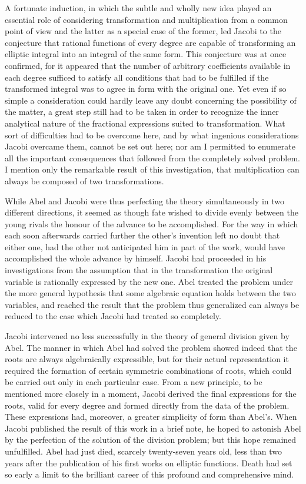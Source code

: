 \documentclass[11pt]{article}
\begin{document}
A fortunate induction, in which the subtle and wholly new idea played an essential role of considering transformation and multiplication from a common point of view and the latter as a special case of the former, led Jacobi to the conjecture that rational functions of every degree are capable of transforming an elliptic integral into an integral of the same form. This conjecture was at once confirmed, for it appeared that the number of arbitrary coefficients available in each degree sufficed to satisfy all conditions that had to be fulfilled if the transformed integral was to agree in form with the original one. Yet even if so simple a consideration could hardly leave any doubt concerning the possibility of the matter, a great step still had to be taken in order to recognize the inner analytical nature of the fractional expressions suited to transformation. What sort of difficulties had to be overcome here, and by what ingenious considerations Jacobi overcame them, cannot be set out here; nor am I permitted to enumerate all the important consequences that followed from the completely solved problem. I mention only the remarkable result of this investigation, that multiplication can always be composed of two transformations.

While Abel and Jacobi were thus perfecting the theory simultaneously in two different directions, it seemed as though fate wished to divide evenly between the young rivals the honour of the advance to be accomplished. For the way in which each soon afterwards carried further the other's invention left no doubt that either one, had the other not anticipated him in part of the work, would have accomplished the whole advance by himself. Jacobi had proceeded in his investigations from the assumption that in the transformation the original variable is rationally expressed by the new one. Abel treated the problem under the more general hypothesis that some algebraic equation holds between the two variables, and reached the result that the problem thus generalized can always be reduced to the case which Jacobi had treated so completely.

Jacobi intervened no less successfully in the theory of general division given by Abel. The manner in which Abel had solved the problem showed indeed that the roots are always algebraically expressible, but for their actual representation it required the formation of certain symmetric combinations of roots, which could be carried out only in each particular case. From a new principle, to be mentioned more closely in a moment, Jacobi derived the final expressions for the roots, valid for every degree and formed directly from the data of the problem. These expressions had, moreover, a greater simplicity of form than Abel's. When Jacobi published the result of this work in a brief note, he hoped to astonish Abel by the perfection of the solution of the division problem; but this hope remained unfulfilled. Abel had just died, scarcely twenty-seven years old, less than two years after the publication of his first works on elliptic functions. Death had set so early a limit to the brilliant career of this profound and comprehensive mind.
\end{document}
